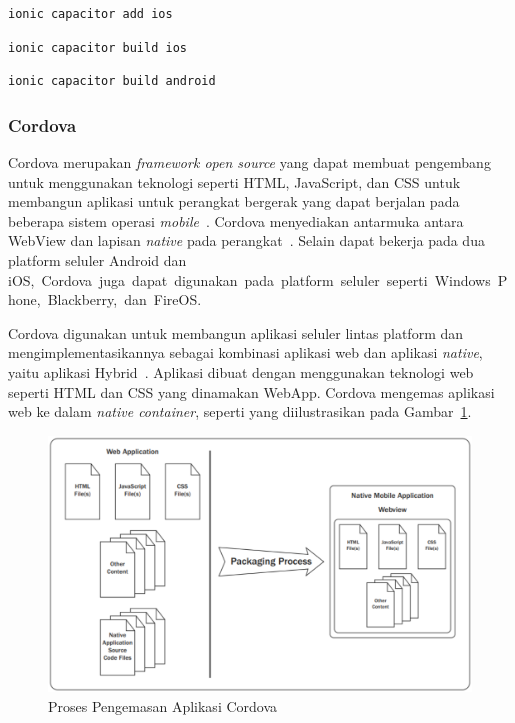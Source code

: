\begin{lstlisting}[label={lst:capaddios}, caption=Kode untuk Menambahkan Platform iOS dengan Capacitor]
ionic capacitor add ios
\end{lstlisting}

\begin{lstlisting}[label={lst:capbuildios}, caption=Kode untuk Membuat Aplikasi Capacitor Untuk Perangkat iOS]
ionic capacitor build ios
\end{lstlisting}

\begin{lstlisting}[label={lst:capbuildandroid}, caption=Kode untuk Membuat Aplikasi Capacitor Untuk Perangkat Android]
ionic capacitor build android
\end{lstlisting}

\subsubsection{Cordova}
\label{subsec:cordova}
Cordova merupakan {\it framework open source} yang dapat membuat pengembang untuk menggunakan teknologi seperti HTML, JavaScript, dan CSS untuk membangun aplikasi untuk perangkat bergerak yang dapat berjalan pada beberapa sistem operasi {\it mobile}~\cite{gonsalves:18:evaluating}. Cordova menyediakan antarmuka antara WebView dan lapisan {\it native} pada perangkat~\cite{griffith:17:mobile}. Selain dapat bekerja pada dua platform seluler Android dan iOS,~Cordova~juga~dapat~digunakan~pada~platform~seluler~seperti~Windows~Phone,~Blackberry,~dan~FireOS. 

Cordova digunakan untuk membangun aplikasi seluler lintas platform dan mengimplementasikannya sebagai kombinasi aplikasi web dan aplikasi \textit{native}, yaitu aplikasi Hybrid~\cite{john:14:apache}. Aplikasi dibuat dengan menggunakan teknologi web seperti HTML dan CSS yang dinamakan WebApp. Cordova mengemas aplikasi web ke dalam \textit{native container}, seperti yang diilustrasikan pada Gambar~\ref{fig:nativecontainercordova}.

\begin{figure}[H]
		\centering
	    \includegraphics[scale=0.45]{Gambar/nativecontainercordova.png}
	    \caption{Proses Pengemasan Aplikasi Cordova~\cite{john:14:apache}}
	    \label{fig:nativecontainercordova}
\end{figure}

